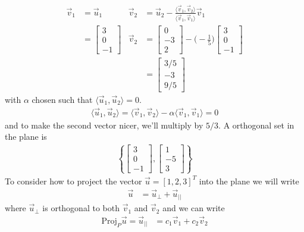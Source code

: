 \begin{example}
\begin{align*}
 \vec{v}_1 & = \vec{u}_1 
& \vec{v}_2 &= \vec{u}_2 - \frac{\langle \vec{v}_1,\vec{v}_2 \rangle}{\langle \vec{v}_1, \vec{v}_1 \rangle} \vec{v}_1  \\
 & = \begin{bmatrix}
 3 \\ 0 \\ -1
 \end{bmatrix}&
 \vec{v}_2 & = \begin{bmatrix}
 0 \\ -3 \\ 2
\end{bmatrix} - \biggl(-\frac{1}{5}\biggr) 
\begin{bmatrix}
 3 \\ 0 \\ -1 
\end{bmatrix} \\
&&&  = 
\begin{bmatrix}
 3/5 \\ -3 \\ 9/5 
\end{bmatrix}
\end{align*}
with $\alpha$ chosen such that $\langle \vec{u}_1,\vec{u}_2\rangle=0.  $
\begin{align*}
 \langle \vec{u}_1,\vec{u}_2 \rangle = \langle \vec{v}_1,\vec{v}_2 \rangle - \alpha \langle \vec{v}_1, \vec{v}_1 \rangle=0 
\end{align*}
and to make the second vector nicer, we'll multiply by $5/3$.  A orthogonal set in the plane is
%
\begin{align*}
\left\{ \begin{bmatrix}
3 \\ 0 \\ -1
\end{bmatrix} , \begin{bmatrix}
1 \\ -5 \\ 3 
\end{bmatrix} \right \}
\end{align*}
To consider how to project the vector $\vec{u} = [1,2,3]^T$ into the plane we will write
\begin{align*}
\vec{u} & = \vec{u}_{\perp} + \vec{u}_{||}
\end{align*}
where $\vec{u}_{\perp}$ is orthogonal to both $\vec{v}_1$ and $\vec{v}_2$ and we can write
%
\begin{align*}
\text{Proj}_{P}\vec{u} = \vec{u}_{||} & = c_1 \vec{v}_1 + c_2 \vec{v}_2 

\end{align*}
\end{example}
